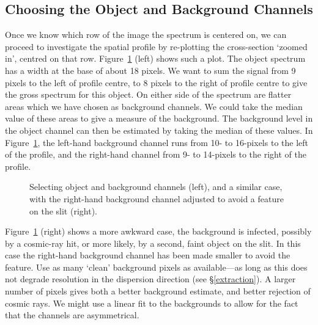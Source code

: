 \documentclass[twoside,11pt]{article}
\newcommand{\htmlref}[2]{#1}
\newcommand{\xlabel}[1]{}
\newcommand{\mlabel}[1]{\xlabel{#1}\label{#1}}
\newcommand{\scspec}[2]{#1}
\newcommand{\scspec}[2]{#2}
\begin{document}
\subsection{\mlabel{selecting_channels}Choosing the Object and Background
            Channels}

Once we know which row of the image the spectrum is centered on, we can
proceed to investigate the spatial profile by re-plotting the
cross-section
`zoomed in', centred on that row.
\scspec{Figure~\ref{fi_channel_select}}{The first figure below}
(left) shows such a plot.
The object spectrum has a width at the base of about 18 pixels.
We want to sum the signal from 9 pixels to the left of profile
centre, to 8 pixels to the right of profile centre to give the
gross spectrum for this object.
On either side of the spectrum are flatter areas which we have
chosen as background channels.
We could take the median value of these areas to give a measure
of the background.
The background level in the object channel can then be estimated
by taking the median of these values.
In \scspec{Figure~\ref{fi_channel_select}}{the first figure below},
the left-hand background channel runs from 10- to 16-pixels to the
left of the profile, and the right-hand channel from 9- to 14-pixels
to the right of the profile.

\begin{figure}
\begin{center}
  \scspec{\leavevmode\epsfysize=55mm\epsfbox{sc7_03.eps}}
         {\leavevmode\epsfysize=66mm}

  \parbox{140mm}{
    \caption{Selecting object and background channels (left), and a
             similar case, with the right-hand background channel
	     adjusted to avoid a feature on the slit (right).}
    \label{fi_channel_select}
  }
\end{center}
\end{figure}

\scspec{Figure~\ref{fi_channel_select}}{The figure above} (right)
shows a more awkward case, the background is infected,
possibly by a \htmlref{cosmic-ray hit}{gl_cosmic_ray},
or more likely, by a second, faint object on the slit.
In this case the right-hand background channel has been made
smaller to avoid the feature.
Use as many `clean' background pixels as available\scspec{---}{ - }as
long as this does not degrade resolution in the dispersion direction
(see \scspec{\S\ref{extraction}}
{\htmlref{{\sl{Extracting the Spectrum}}}{extraction}}).
A larger number of pixels gives both a better background
estimate, and better rejection of cosmic rays.
We might use a linear fit to the backgrounds to allow for the fact
that the channels are asymmetrical.
\end{document}
